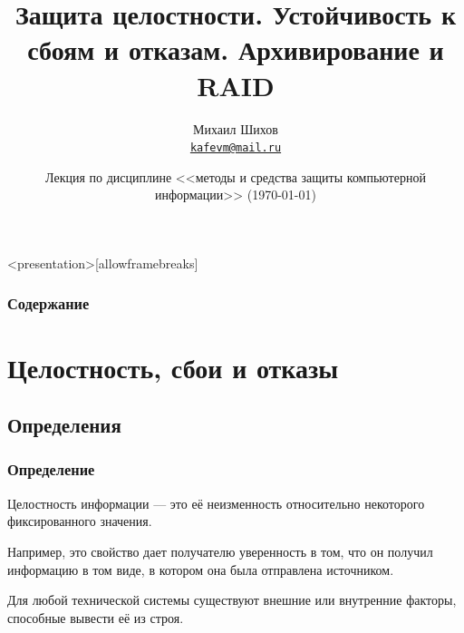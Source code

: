 

\usepackage[russian]{babel}
\usepackage[utf8]{inputenc}
\usepackage{graphicx}


\title[Архивирование и RAID]{Защита целостности. Устойчивость к сбоям и отказам. Архивирование и RAID}
\date{Лекция по дисциплине <<методы и средства защиты компьютерной информации>> (\today)}
\author[М.~М.~Шихов]{Михаил Шихов \\ \texttt{\underline{kafevm@mail.ru}}}






\begin{frame}<presentation>[allowframebreaks]
\frametitle{Содержание}
\tableofcontents
\end{frame}


\section{Целостность, сбои и отказы}


\subsection{Определения}


\begin{frame}
    \frametitle{Определение}
    
    \begin{definition}%
        \alert{Целостность} информации --- это её неизменность относительно некоторого фиксированного значения.
    \end{definition}
    Например, это свойство дает \alert{получателю} уверенность в том, что он получил информацию в том виде, 
    в котором она была отправлена \alert{источником}. 
    
    Для любой технической системы существуют внешние или внутренние факторы, способные вывести её из строя.
\end{frame}


